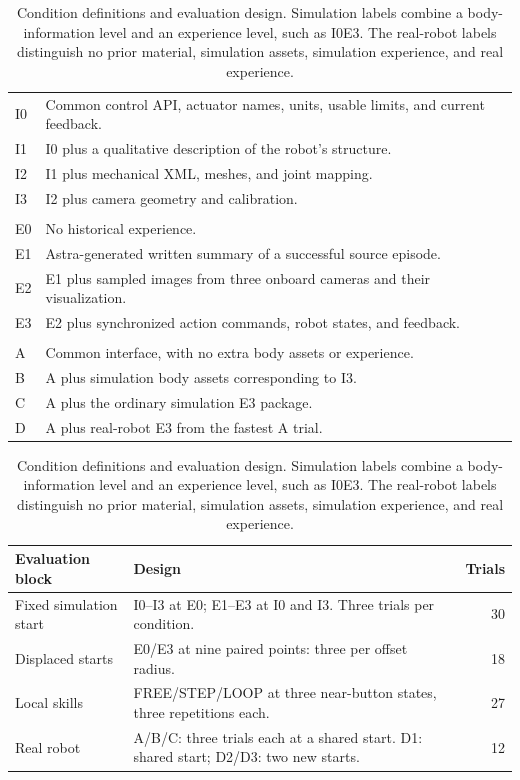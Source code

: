 \documentclass[11pt]{article}
\begin{document}
\begin{table}[t]
\centering\small
\renewcommand{\arraystretch}{1.12}
\begin{tabular}{@{}>{\raggedright\arraybackslash}p{1.3cm}>{\raggedright\arraybackslash}p{\dimexpr\linewidth-1.3cm-2\tabcolsep\relax}@{}}
\toprule
\multicolumn{2}{@{}l}{\textbf{Body information}}\\\midrule
I0 & Common control API, actuator names, units, usable limits, and current feedback.\\
I1 & I0 plus a qualitative description of the robot's structure.\\
I2 & I1 plus mechanical XML, meshes, and joint mapping.\\
I3 & I2 plus camera geometry and calibration.\\\midrule
\multicolumn{2}{@{}l}{\textbf{Historical experience}}\\\midrule
E0 & No historical experience.\\
E1 & Astra-generated written summary of a successful source episode.\\
E2 & E1 plus sampled images from three onboard cameras and their visualization.\\
E3 & E2 plus synchronized action commands, robot states, and feedback.\\\midrule
\multicolumn{2}{@{}l}{\textbf{Real-robot conditions}}\\\midrule
A & Common interface, with no extra body assets or experience.\\
B & A plus simulation body assets corresponding to I3.\\
C & A plus the ordinary simulation E3 package.\\
D & A plus real-robot E3 from the fastest A trial.\\\bottomrule
\end{tabular}

\vspace{0.8em}
\begin{tabular}{@{}>{\raggedright\arraybackslash}p{3.0cm}>{\raggedright\arraybackslash}p{10.3cm}r@{}}
\toprule
Evaluation block & Design & Trials\\\midrule
Fixed simulation start & I0--I3 at E0; E1--E3 at I0 and I3. Three trials per condition. & 30\\
Displaced starts & E0/E3 at nine paired points: three per offset radius. & 18\\
Local skills & FREE/STEP/LOOP at three near-button states, three repetitions each. & 27\\
Real robot & A/B/C: three trials each at a shared start. D1: shared start; D2/D3: two new starts. & 12\\
\bottomrule
\end{tabular}
\caption{Condition definitions and evaluation design. Simulation labels combine a body-information level and an experience level, such as I0E3. The real-robot labels distinguish no prior material, simulation assets, simulation experience, and real experience.}
\label{tab:design}
\end{table}
\end{document}
